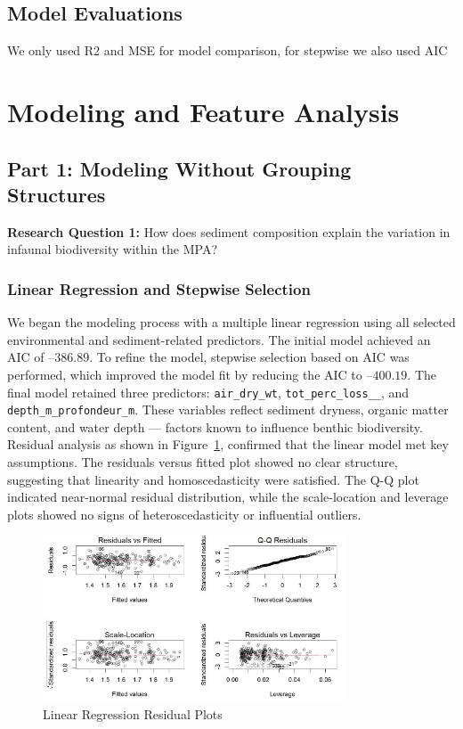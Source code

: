 \documentclass[12pt]{article}
\begin{document}
\subsection{Model Evaluations}

\qquad We only used R2 and MSE for model comparison, for stepwise we also used AIC


\newpage

\section{Modeling and Feature Analysis}

\subsection{Part 1: Modeling Without Grouping Structures}

\textbf{Research Question 1:} How does sediment composition explain the variation in infaunal biodiversity within the MPA?

\subsubsection{Linear Regression and Stepwise Selection}

\qquad We began the modeling process with a multiple linear regression using all selected environmental and sediment-related predictors. The initial model achieved an AIC of $–386.89$. To refine the model, stepwise selection based on AIC was performed, which improved the model fit by reducing the AIC to $–400.19$. The final model retained three predictors: \texttt{air\_dry\_wt}, \texttt{tot\_perc\_loss\_\_}, and \texttt{depth\_m\_profondeur\_m}. These variables reflect sediment dryness, organic matter content, and water depth — factors known to influence benthic biodiversity. Residual analysis as shown in Figure~\ref{fig:residual-plots}, confirmed that the linear model met key assumptions. The residuals versus fitted plot showed no clear structure, suggesting that linearity and homoscedasticity were satisfied. The Q-Q plot indicated near-normal residual distribution, while the scale-location and leverage plots showed no signs of heteroscedasticity or influential outliers.

\begin{figure}[h!]
\centering
\includegraphics[width=0.8\textwidth]{linear-regression-residual-plots.jpg}
\caption{Linear Regression Residual Plots}
\label{fig:residual-plots}
\end{figure}
\end{document}
